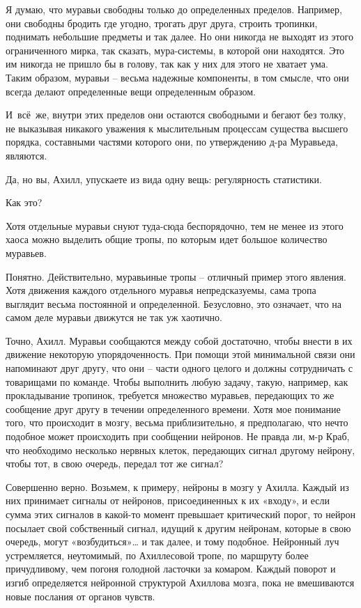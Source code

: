 \documentclass[../main.tex]{subfiles}
\begin{document}
\begin{dialogue}
 Я думаю, что муравьи свободны только до определенных пределов. Например, они свободны бродить где угодно, трогать друг друга, строить тропинки, поднимать небольшие предметы и так далее. Но они никогда не выходят из этого ограниченного мирка, так сказать, мура-системы, в которой они находятся. Это им никогда не пришло бы в голову, так как у них для этого не хватает ума. Таким образом, муравьи \--- весьма надежные компоненты, в том смысле, что они всегда делают определенные вещи определенным образом.

 И~всё~же, внутри этих пределов они остаются свободными и бегают без толку, не выказывая никакого уважения к мыслительным процессам существа высшего порядка, составными частями которого они, по утверждению д-ра Муравьеда, являются.

 Да, но вы, Ахилл, упускаете из вида одну вещь: регулярность статистики.

 Как это?

 Хотя отдельные муравьи снуют туда-сюда беспорядочно, тем не менее из этого хаоса можно выделить общие тропы, по которым идет большое количество муравьев.

 Понятно. Действительно, муравьиные тропы \--- отличный пример этого явления. Хотя движения каждого отдельного муравья непредсказуемы, сама тропа выглядит весьма постоянной и определенной. Безусловно, это означает, что на самом деле муравьи движутся не так уж хаотично.

 Точно, Ахилл. Муравьи сообщаются между собой достаточно, чтобы внести в их движение некоторую упорядоченность. При помощи этой минимальной связи они напоминают друг другу, что они \--- части одного целого и должны сотрудничать с товарищами по команде. Чтобы выполнить любую задачу, такую, например, как прокладывание тропинок, требуется множество муравьев, передающих то же сообщение друг другу в течении определенного времени. Хотя мое понимание того, что происходит в мозгу, весьма приблизительно, я предполагаю, что нечто подобное может происходить при сообщении нейронов. Не правда ли, м-р Краб, что необходимо несколько нервных клеток, передающих сигнал другому нейрону, чтобы тот, в свою очередь, передал тот же сигнал?

 Совершенно верно. Возьмем, к примеру, нейроны в мозгу у Ахилла. Каждый из них принимает сигналы от нейронов, присоединенных к их «входу», и если сумма этих сигналов в какой-то момент превышает критический порог, то нейрон посылает свой собственный сигнал, идущий к другим нейронам, которые в свою очередь, могут «возбудиться»\ldots{} и так далее, и тому подобное. Нейронный луч устремляется, неутомимый, по Ахиллесовой тропе, по маршруту более причудливому, чем погоня голодной ласточки за комаром. Каждый поворот и изгиб определяется нейронной структурой Ахиллова мозга, пока не вмешиваются новые послания от органов чувств.


\end{dialogue}
\end{document}
